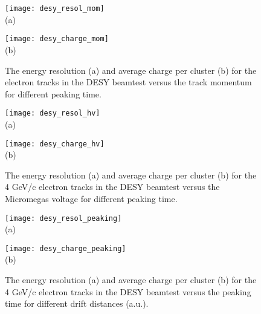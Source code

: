 \documentclass[../main.tex]{subfiles}
\begin{document}
\begin{figure}[!ht]
  \centering
  \begin{minipage}{0.49\linewidth}
    \centering
    \texttt{[image: desy\_resol\_mom]} \\ (a)
  \end{minipage}
  \begin{minipage}{0.49\linewidth}
    \centering
    \texttt{[image: desy\_charge\_mom]} \\ (b)
  \end{minipage}
  \caption{The energy resolution (a) and average charge per cluster (b) for the electron tracks in the DESY beamtest versus the track momentum for different peaking time.}
  \label{fig:tpc:desy_dedx2}
\end{figure}

\begin{figure}[!ht]
  \centering
  \begin{minipage}{0.49\linewidth}
    \centering
    \texttt{[image: desy\_resol\_hv]} \\ (a)
  \end{minipage}
  \begin{minipage}{0.49\linewidth}
    \centering
    \texttt{[image: desy\_charge\_hv]} \\ (b)
  \end{minipage}
  \caption{The energy resolution (a) and average charge per cluster (b) for the 4 GeV/c electron tracks in the DESY beamtest versus the Micromegas voltage for different peaking time.}
  \label{fig:tpc:desy_dedx3}
\end{figure}

\begin{figure}[!ht]
  \centering
  \begin{minipage}{0.49\linewidth}
    \centering
    \texttt{[image: desy\_resol\_peaking]} \\ (a)
  \end{minipage}
  \begin{minipage}{0.49\linewidth}
    \centering
    \texttt{[image: desy\_charge\_peaking]} \\ (b)
  \end{minipage}
  \caption{The energy resolution (a) and average charge per cluster (b) for the 4 GeV/c electron tracks in the DESY beamtest versus the peaking time for different drift distances (a.u.).}
  \label{fig:tpc:desy_dedx4}
\end{figure}
\end{document}
